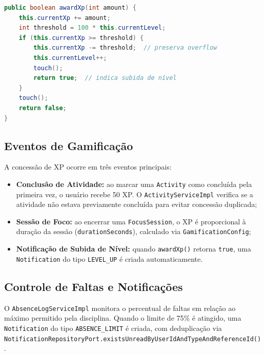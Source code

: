 \begin{lstlisting}[language=Java, caption={Método awardXp da entidade User},label={lst:award-xp}]
public boolean awardXp(int amount) {
    this.currentXp += amount;
    int threshold = 100 * this.currentLevel;
    if (this.currentXp >= threshold) {
        this.currentXp -= threshold;  // preserva overflow
        this.currentLevel++;
        touch();
        return true;  // indica subida de nível
    }
    touch();
    return false;
}
\end{lstlisting}

\subsection{Eventos de Gamificação}
\label{subsec:eventos-gamificacao}

A concessão de XP ocorre em três eventos principais:

\begin{itemize}
  \item \textbf{Conclusão de Atividade:} ao marcar uma \texttt{Activity} como
        concluída pela primeira vez, o usuário recebe 50 XP. O
        \texttt{ActivityServiceImpl} verifica se a atividade não estava
        previamente concluída para evitar concessão duplicada;

  \item \textbf{Sessão de Foco:} ao encerrar uma \texttt{FocusSession},
        o XP é proporcional à duração da sessão (\texttt{durationSeconds}),
        calculado via \texttt{GamificationConfig};

  \item \textbf{Notificação de Subida de Nível:} quando \texttt{awardXp()}
        retorna \texttt{true}, uma \texttt{Notification} do tipo
        \texttt{LEVEL\_UP} é criada automaticamente.
\end{itemize}

\subsection{Controle de Faltas e Notificações}
\label{subsec:controle-faltas}

O \texttt{AbsenceLogServiceImpl} monitora o percentual de faltas em relação ao
máximo permitido pela disciplina. Quando o limite de 75\% é atingido, uma
\texttt{Notification} do tipo \texttt{ABSENCE\_LIMIT} é criada, com deduplicação
via \texttt{NotificationRepositoryPort.existsUnreadByUserIdAndTypeAndReferenceId()}.

